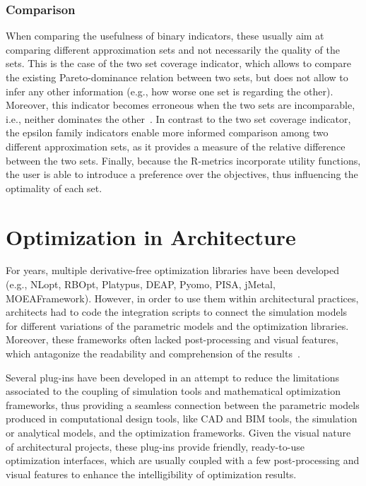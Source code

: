 	\subsubsection{Comparison}
	\label{ssec:comparisonindicators}
	When comparing the usefulness of binary indicators, these usually aim at comparing different approximation sets and not necessarily the quality of the sets. This is the case of the two set coverage indicator, which allows to compare the existing Pareto-dominance relation between two sets, but does not allow to infer any other information (e.g., how worse one set is regarding the other). Moreover, this indicator becomes erroneous when the two sets are incomparable, i.e., neither dominates the other~\cite{Zitzler2003Metrics}. In contrast to the two set coverage indicator, the epsilon family indicators enable more informed comparison among two different approximation sets, as it provides a measure of the relative difference between the two sets. Finally, because the R-metrics incorporate utility functions, the user is able to introduce a preference over the objectives, thus influencing the optimality of each set. 
	
	\section{Optimization in Architecture}	
	\label{sec:optimizationtools}
	
	For years, multiple derivative-free optimization libraries have been developed (e.g., NLopt, RBOpt, Platypus, DEAP, Pyomo, PISA, jMetal, MOEAFramework). However, in order to use them within architectural practices, architects had to code the integration scripts to connect the simulation models for different variations of the parametric models and the optimization libraries\cite{Attia2013}. Moreover, these frameworks often lacked post-processing and visual features, which antagonize the readability and comprehension of the results~\cite{Attia2013,Nguyen2014}.
	
	Several plug-ins have been developed in an attempt to reduce the limitations associated to the coupling of simulation tools and mathematical optimization frameworks, thus providing a seamless connection between the parametric models produced in computational design tools, like \ac{CAD} and \ac{BIM} tools, the simulation or analytical models, and the optimization frameworks. Given the visual nature of architectural projects, these plug-ins provide friendly, ready-to-use optimization interfaces, which are usually coupled with a few post-processing and visual features to enhance the intelligibility of optimization results. 
	

